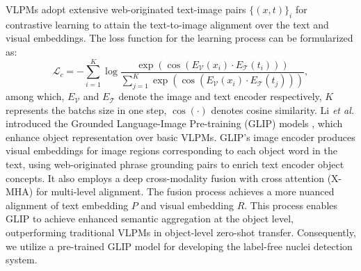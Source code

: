 \documentclass[journal,twoside,web]{ieeecolor}
\begin{document}

VLPMs adopt extensive web-originated text-image pairs $\{ (x,t )\}_{i}$ for contrastive learning to attain the text-to-image alignment over the text and visual embeddings. The loss function for the learning process can be formularized as: 
\begin{equation}
\label{eq1}
\mathcal{L}_c=-\sum_{i=1}^K \log \frac{\exp \left(\cos \left( E_{\mathcal{V}}\left(x_i\right) \cdot E_{\mathcal{T}}\left(t_i\right)\right) \right)}{\sum_{j=1}^K \exp \left(\cos \left(E_{\mathcal{V}}\left(x_i\right) \cdot E_{\mathcal{T}}\left(t_j\right)\right)\right)},
\end{equation}
among which, $E_{\mathcal{V}}$ and $E_{\mathcal{T}}$ denote the image and text encoder respectively, $K$ represents the batchs size in one step, $\cos(\cdot)$ denotes cosine similarity. Li \textit{et al.} introduced the Grounded Language-Image Pre-training (GLIP) models \cite{li2022grounded}, which enhance object representation over basic VLPMs. GLIP's image encoder produces visual embeddings for image regions corresponding to each object word in the text, using web-originated phrase grounding pairs to enrich text encoder object concepts. It also employs a deep cross-modality fusion with cross attention (X-MHA) \cite{chen2021crossvit} for multi-level alignment. The fusion process achieves a more nuanced alignment of text embedding $P$ and visual embedding $R$. This process enables GLIP to achieve enhanced semantic aggregation at the object level, outperforming traditional VLPMs in object-level zero-shot transfer. Consequently, we utilize a pre-trained GLIP model for developing the label-free nuclei detection system.
\end{document}
